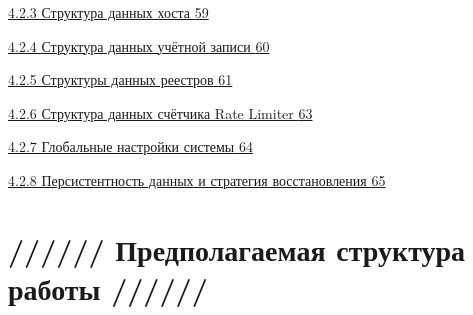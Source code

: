\documentclass[
]{article}
\begin{document}
\hyperref[ux441ux442ux440ux443ux43aux442ux443ux440ux430-ux434ux430ux43dux43dux44bux445-ux445ux43eux441ux442ux430]{4.2.3
Структура данных хоста
\hyperref[ux441ux442ux440ux443ux43aux442ux443ux440ux430-ux434ux430ux43dux43dux44bux445-ux445ux43eux441ux442ux430]{59}}

\hyperref[ux441ux442ux440ux443ux43aux442ux443ux440ux430-ux434ux430ux43dux43dux44bux445-ux443ux447ux451ux442ux43dux43eux439-ux437ux430ux43fux438ux441ux438]{4.2.4
Структура данных учётной записи
\hyperref[ux441ux442ux440ux443ux43aux442ux443ux440ux430-ux434ux430ux43dux43dux44bux445-ux443ux447ux451ux442ux43dux43eux439-ux437ux430ux43fux438ux441ux438]{60}}

\hyperref[ux441ux442ux440ux443ux43aux442ux443ux440ux44b-ux434ux430ux43dux43dux44bux445-ux440ux435ux435ux441ux442ux440ux43eux432]{4.2.5
Структуры данных реестров
\hyperref[ux441ux442ux440ux443ux43aux442ux443ux440ux44b-ux434ux430ux43dux43dux44bux445-ux440ux435ux435ux441ux442ux440ux43eux432]{61}}

\hyperref[ux441ux442ux440ux443ux43aux442ux443ux440ux430-ux434ux430ux43dux43dux44bux445-ux441ux447ux451ux442ux447ux438ux43aux430-rate-limiter]{4.2.6
Структура данных счётчика Rate Limiter
\hyperref[ux441ux442ux440ux443ux43aux442ux443ux440ux430-ux434ux430ux43dux43dux44bux445-ux441ux447ux451ux442ux447ux438ux43aux430-rate-limiter]{63}}

\hyperref[ux433ux43bux43eux431ux430ux43bux44cux43dux44bux435-ux43dux430ux441ux442ux440ux43eux439ux43aux438-ux441ux438ux441ux442ux435ux43cux44b]{4.2.7
Глобальные настройки системы
\hyperref[ux433ux43bux43eux431ux430ux43bux44cux43dux44bux435-ux43dux430ux441ux442ux440ux43eux439ux43aux438-ux441ux438ux441ux442ux435ux43cux44b]{64}}

\hyperref[ux43fux435ux440ux441ux438ux441ux442ux435ux43dux442ux43dux43eux441ux442ux44c-ux434ux430ux43dux43dux44bux445-ux438-ux441ux442ux440ux430ux442ux435ux433ux438ux44f-ux432ux43eux441ux441ux442ux430ux43dux43eux432ux43bux435ux43dux438ux44f]{4.2.8
Персистентность данных и стратегия восстановления
\hyperref[ux43fux435ux440ux441ux438ux441ux442ux435ux43dux442ux43dux43eux441ux442ux44c-ux434ux430ux43dux43dux44bux445-ux438-ux441ux442ux440ux430ux442ux435ux433ux438ux44f-ux432ux43eux441ux441ux442ux430ux43dux43eux432ux43bux435ux43dux438ux44f]{65}}

\textbf{\hfill\break
}

\section{////// Предполагаемая структура работы
//////}\label{ux43fux440ux435ux434ux43fux43eux43bux430ux433ux430ux435ux43cux430ux44f-ux441ux442ux440ux443ux43aux442ux443ux440ux430-ux440ux430ux431ux43eux442ux44b}
\end{document}
